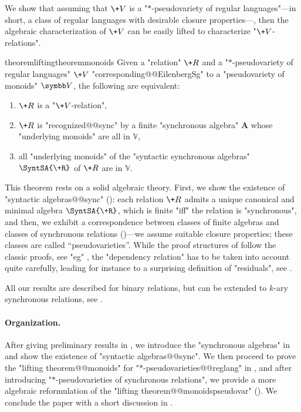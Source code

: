We show that assuming that $\+V$ is a "$*$-pseudovariety of regular languages"---in short, a class of regular languages with desirable closure properties---, then the algebraic characterization of $\+V$ can be easily lifted to characterize "$\+V$-relations".

\begin{restatable*}{theorem}{liftingtheoremmonoids}
	\AP\label{thm:lifting-theorem-monoids}
	Given a "relation" $\+R$ and a "$\ast$-pseudovariety of regular languages" $\+V$
	"corresponding@@EilenbergSg" to a "pseudovariety of monoids" $\B{V}$,
	the following are equivalent:
	\begin{enumerate}
		\item $\+R$ is a "$\+V$-relation",
		\item $\+R$ is "recognized@@sync" by a finite "synchronous algebra" $\mathbf{A}$
			whose "underlying monoids" are all in $\mathbb{V}$,
		\item all "underlying monoids" of the "syntactic synchronous algebras" $\SyntSA{\+R}$ of
			$\+R$ are in $\mathbb{V}$.
	\end{enumerate} 
\end{restatable*}

This theorem rests on a solid algebraic theory. 
First, we show the existence of "syntactic algebras@@sync" (): 
each relation $\+R$ admits a unique canonical and minimal algebra $\SyntSA{\+R}$, which is finite 
"iff" the relation is "synchronous",
and then, we exhibit a correspondence between classes of finite algebras and classes of
synchronous relations ()---we assume suitable closure properties; these classes are called ``pseudovarieties''.
While the proof structures of  follow the classic proofs, see "eg" \cite{Pin2022MathematicalFoundations},
the "dependency relation" has to be taken into account quite carefully, leading for instance
to a surprising definition of "residuals", see .

\begin{remark}
	All our results are described for binary relations, but can be extended to
	$k$-ary synchronous relations, see .
\end{remark}

\paragraph*{Organization.} After giving preliminary results in , we introduce
the "synchronous algebras" in  and show the existence of
"syntactic algebras@@sync". We then proceed to prove the "lifting theorem@@monoids" for 
"$*$-pseudovarieties@@reglang" in , and after introducing "$*$-pseudovarieties of synchronous relations", we provide a more algebraic reformulation of the "lifting 
theorem@@monoidspseudovar" ().
We conclude the paper with
a short discussion in .

